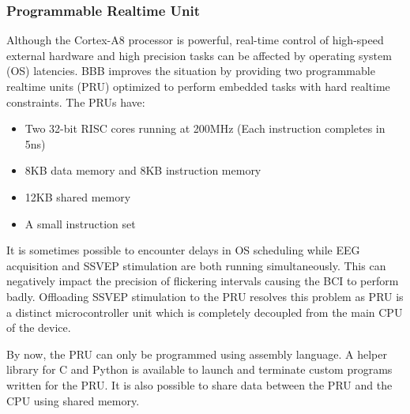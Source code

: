 \documentclass[12pt]{article}
\newcommand\mysubsubsection[1]{\subsubsection{#1}}
\numberwithin{equation}{section}
\numberwithin{figure}{section}
\numberwithin{table}{section}
\begin{document}
\mysubsubsection{Programmable Realtime Unit}\label{seq:embeddedcomputer_bbb_pru}
\par{
    Although the Cortex-A8 processor is powerful, real-time control of high-speed external hardware
    and high precision tasks can be affected by operating system (OS) latencies. BBB improves the
    situation by providing two programmable realtime units (PRU) optimized to perform embedded tasks
    with hard realtime constraints. The PRUs have:
    \begin{itemize}
        \item Two 32-bit RISC cores running at 200MHz (Each instruction completes in 5ns)
        \item 8KB data memory and 8KB instruction memory
        \item 12KB shared memory
        \item A small instruction set
    \end{itemize}
    It is sometimes possible to encounter delays in OS scheduling while EEG
    acquisition and SSVEP stimulation are both running simultaneously. This can negatively
    impact the precision of flickering intervals causing the BCI to perform badly.
    Offloading SSVEP stimulation to the PRU resolves this problem as PRU is a distinct
    microcontroller unit which is completely decoupled from the main CPU of the device.
}
\par{
    By now, the PRU can only be programmed using assembly language. A helper library
    for C and Python is available to launch and terminate custom programs written for the PRU.
    It is also possible to share data between the PRU and the CPU using shared memory.
}
\end{document}
